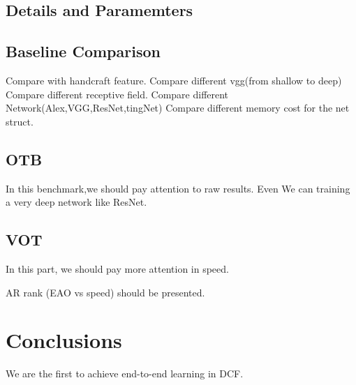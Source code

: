 \documentclass[11pt]{article}
\begin{document}
\subsection{Details and Paramemters}


\subsection{Baseline Comparison}
Compare with handcraft feature.
Compare different vgg(from shallow to deep)
Compare different receptive field.
Compare different Network(Alex,VGG,ResNet,tingNet)
Compare different memory cost for the net struct.


\subsection{OTB}
In this benchmark,we should pay attention to raw results. Even We can training a very deep network like ResNet.

\subsection{VOT}
In this part, we should pay more attention in speed. 

AR rank 
(EAO  vs speed)  should be presented.


\section{Conclusions}
We are the first to achieve end-to-end learning in DCF.

\pagebreak		


\end{document}
